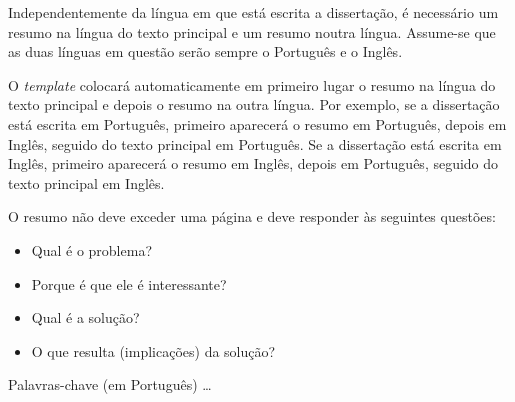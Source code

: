 Independentemente da língua em que está escrita a dissertação, é necessário um resumo na língua do texto principal e um resumo noutra língua.  Assume-se que as duas línguas em questão serão sempre o Português e o Inglês.

O \emph{template} colocará automaticamente em primeiro lugar o resumo na língua do texto principal e depois o resumo na outra língua.  Por exemplo, se a dissertação está escrita em Português, primeiro aparecerá o resumo em Português, depois em Inglês, seguido do texto principal em Português. Se a dissertação está escrita em Inglês, primeiro aparecerá o resumo em Inglês, depois em Português, seguido do texto principal em Inglês.

O resumo não deve exceder uma página e deve responder às seguintes questões:
\begin{itemize}
	\item Qual é o problema?
	\item Porque é que ele é interessante?
	\item Qual é a solução?
	\item O que resulta (implicações) da solução?
\end{itemize}

\begin{keywords}
Palavras-chave (em Português) \ldots
\end{keywords}
